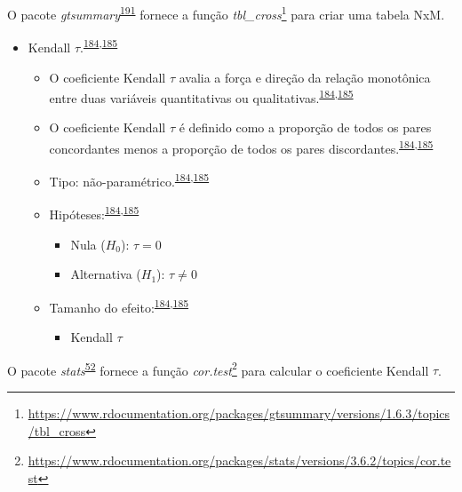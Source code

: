 \documentclass[
  a4paper,
]{book}
\providecommand{\tightlist}{%
  \setlength{\itemsep}{0pt}\setlength{\parskip}{0pt}}
\renewcommand{\href}[2]{#2\footnote{\url{#1}}}
\newenvironment{infobox}[1]
  {
  \begin{itemize}
  \renewcommand{\labelitemi}{
    \raisebox{-.7\height}[0pt][0pt]{
      {\setkeys{Gin}{width=3em,keepaspectratio}
        \texttt{[image: \#1]}}
    }
  }
  \setlength{\fboxsep}{1em}
  \begin{blackbox}
  \item
  }
  {
  \end{blackbox}
  \end{itemize}
  }
\begin{document}
\begin{infobox}{images/Rlogo}
O pacote \emph{gtsummary}\textsuperscript{\protect\hyperlink{ref-gtsummary}{191}} fornece a função \href{https://www.rdocumentation.org/packages/gtsummary/versions/1.6.3/topics/tbl_cross}{\emph{tbl\_cross}} para criar uma tabela NxM.

\end{infobox}

\begin{itemize}
\item
  Kendall \(\tau\).\textsuperscript{\protect\hyperlink{ref-khamis2008}{184},\protect\hyperlink{ref-allison2022}{185}}

  \begin{itemize}
  \item
    O coeficiente Kendall \(\tau\) avalia a força e direção da relação monotônica entre duas variáveis quantitativas ou qualitativas.\textsuperscript{\protect\hyperlink{ref-khamis2008}{184},\protect\hyperlink{ref-allison2022}{185}}
  \item
    O coeficiente Kendall \(\tau\) é definido como a proporção de todos os pares concordantes menos a proporção de todos os pares discordantes.\textsuperscript{\protect\hyperlink{ref-khamis2008}{184},\protect\hyperlink{ref-allison2022}{185}}
  \item
    Tipo: não-paramétrico.\textsuperscript{\protect\hyperlink{ref-khamis2008}{184},\protect\hyperlink{ref-allison2022}{185}}
  \item
    Hipóteses:\textsuperscript{\protect\hyperlink{ref-khamis2008}{184},\protect\hyperlink{ref-allison2022}{185}}

    \begin{itemize}
    \item
      Nula (\(H_{0}\)): \(\tau=0\)
    \item
      Alternativa (\(H_{1}\)): \(\tau≠0\)
    \end{itemize}
  \item
    Tamanho do efeito:\textsuperscript{\protect\hyperlink{ref-khamis2008}{184},\protect\hyperlink{ref-allison2022}{185}}

    \begin{itemize}
    \tightlist
    \item
      Kendall \(\tau\)
    \end{itemize}
  \end{itemize}
\end{itemize}

\begin{infobox}{images/Rlogo}
O pacote \emph{stats}\textsuperscript{\protect\hyperlink{ref-stats-2}{52}} fornece a função \href{https://www.rdocumentation.org/packages/stats/versions/3.6.2/topics/cor.test}{\emph{cor.test}} para calcular o coeficiente Kendall \(\tau\).

\end{infobox}
\end{document}
